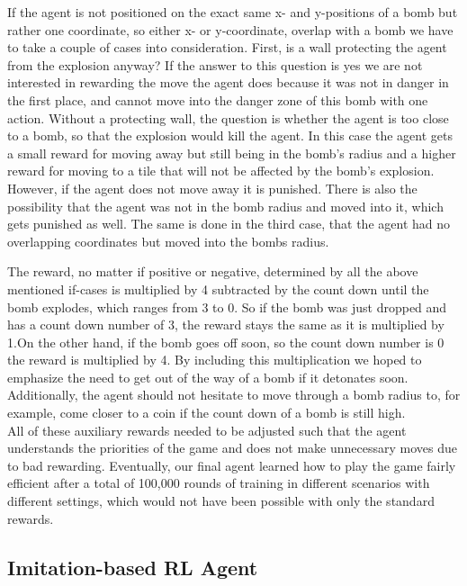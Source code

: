 If the agent is not positioned on the exact same x- and y-positions of a bomb but rather one coordinate, so either x- or y-coordinate, overlap with a bomb we have to take a couple of cases into consideration. First, is a wall protecting the agent from the explosion anyway? If the answer to this question is yes we are not interested in rewarding the move the agent does because it was not in danger in the first place, and cannot move into the danger zone of this bomb with one action. Without a protecting wall, the question is whether the agent is too close to a bomb, so that the explosion would kill the agent. In this case the agent gets a small reward for moving away but still being in the bomb's radius and a higher reward for moving to a tile that will not be affected by the bomb's explosion. However, if the agent does not move away it is punished. There is also the possibility that the agent was not in the bomb radius and moved into it, which gets punished as well. The same is done in the third case, that the agent had no overlapping coordinates but moved into the bombs radius.

The reward, no matter if positive or negative, determined by all the above mentioned if-cases is multiplied by 4 subtracted by the count down until the bomb explodes, which ranges from 3 to 0. So if the bomb was just dropped and has a count down number of 3, the reward stays the same as it is multiplied by 1.On the other hand, if the bomb goes off soon, so the count down number is 0 the reward is multiplied by 4. By including this multiplication we hoped to emphasize the need to get out of the way of a bomb if it detonates soon. Additionally, the agent should not hesitate to move through a bomb radius to, for example, come closer to a coin if the count down of a bomb is still high.
\\ 

All of these auxiliary rewards needed to be adjusted such that the agent understands the priorities of the game and does not make unnecessary moves due to bad rewarding. Eventually, our final agent learned how to play the game fairly efficient after a total of 100,000 rounds of training in different scenarios with different settings, which would not have been possible with only the standard rewards.


\subsection{Imitation-based RL Agent}


